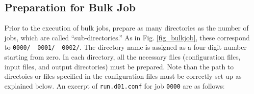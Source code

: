 \subsection{Preparation for Bulk Job}
Prior to the execution of bulk jobs, prepare as many directories as the number of jobs, which are called ``sub-directories.'' As in Fig. \ref{fig_bulkjob}, these correspond to \verb|0000/  0001/  0002/|. The directory name is assigned as a four-digit number starting from zero. In each directory, all the necessary files (configuration files, input files, and output directories) must be prepared.
Note than the path to directoies or files specified in the configuration files must be correctly set up as explained below.
An excerpt of \verb|run.d01.conf| for job \verb|0000| are as follows:

